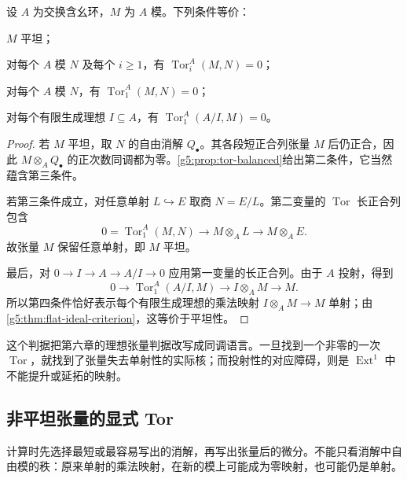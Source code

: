 \begin{proposition}\label{g5:prop:flatness-tor}
	设 \(A\) 为交换含幺环，\(M\) 为 \(A\) 模。下列条件等价：
	\begin{equivalences}
		\item \(M\) 平坦；
		\item 对每个 \(A\) 模 \(N\) 及每个 \(i\geq1\)，有 \(\operatorname{Tor}_i^A(M,N)=0\)；
		\item 对每个 \(A\) 模 \(N\)，有 \(\operatorname{Tor}_1^A(M,N)=0\)；
		\item 对每个有限生成理想 \(I\subseteq A\)，有 \(\operatorname{Tor}_1^A(A/I,M)=0\)。
	\end{equivalences}
\end{proposition}
\begin{proof}
	若 \(M\) 平坦，取 \(N\) 的自由消解 \(Q_\bullet\)。其各段短正合列张量 \(M\) 后仍正合，因此 \(M\otimes_A Q_\bullet\) 的正次数同调都为零。\cref{g5:prop:tor-balanced}给出第二条件，它当然蕴含第三条件。

	若第三条件成立，对任意单射 \(L\hookrightarrow E\) 取商 \(N=E/L\)。第二变量的 \(\operatorname{Tor}\) 长正合列包含
	\[
		0=\operatorname{Tor}_1^A(M,N)\longrightarrow M\otimes_A L
		\longrightarrow M\otimes_A E.
	\]
	故张量 \(M\) 保留任意单射，即 \(M\) 平坦。

	最后，对 \(0\to I\to A\to A/I\to0\) 应用第一变量的长正合列。由于 \(A\) 投射，得到
	\[
		0\longrightarrow\operatorname{Tor}_1^A(A/I,M)
		\longrightarrow I\otimes_A M\longrightarrow M.
	\]
	所以第四条件恰好表示每个有限生成理想的乘法映射 \(I\otimes_A M\to M\) 单射；由\cref{g5:thm:flat-ideal-criterion}，这等价于平坦性。
\end{proof}

这个判据把第六章的理想张量判据改写成同调语言。一旦找到一个非零的一次 \(\operatorname{Tor}\)，就找到了张量失去单射性的实际核；而投射性的对应障碍，则是 \(\operatorname{Ext}^1\) 中不能提升或延拓的映射。

\subsection{非平坦张量的显式 Tor}
\label{g5:subsec:0801:05}

计算时先选择最短或最容易写出的消解，再写出张量后的微分。不能只看消解中自由模的秩：原来单射的乘法映射，在新的模上可能成为零映射，也可能仍是单射。

